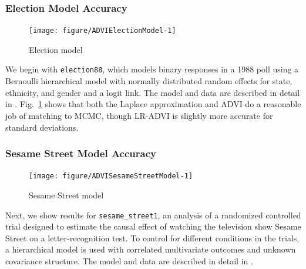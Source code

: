 \documentclass{article}\usepackage[]{graphicx}\usepackage[]{color}
\newenvironment{knitrout}{}{}
\theoremstyle{definition}
\theoremstyle{plain}
\theoremstyle{plain}
\theoremstyle{plain}
\theoremstyle{definition}
\theoremstyle{plain}
\theoremstyle{plain}
\newcommand{\fig}[1]{Fig.~\ref{fig:#1}}
\begin{document}
\subsubsection{Election Model Accuracy}
\begin{knitrout}
\color{fgcolor}\begin{figure}[t]

{\centering \texttt{[image: figure/ADVIElectionModel-1]} 

}

\caption[Election model]{Election model}\label{fig:ADVIElectionModel}
\end{figure}


\end{knitrout}

We begin with \texttt{election88}, which models binary responses in
a 1988 poll using a Bernoulli hierarchical model with normally distributed
random effects for state, ethnicity, and gender and a logit link.
The model and data are described in detail in \citet[Chapter 14]{gelman:2006:arm}.
\fig{ADVIElectionModel} shows that both the Laplace approximation
and ADVI do a reasonable job of matching to MCMC, though LR-ADVI is
slightly more accurate for standard deviations.

\subsubsection{Sesame Street Model Accuracy}

\begin{knitrout}
\color{fgcolor}\begin{figure}[t]

{\centering \texttt{[image: figure/ADVISesameStreetModel-1]} 

}

\caption[Sesame Street model]{Sesame Street model}\label{fig:ADVISesameStreetModel}
\end{figure}


\end{knitrout}

Next, we show results for \texttt{sesame\_street1}, an analysis of
a randomized controlled trial designed to estimate the causal effect
of watching the television show Sesame Street on a letter-recognition
test. To control for different conditions in the trials, a hierarchical
model is used with correlated multivariate outcomes and unknown covariance
structure. The model and data are described in detail in
\citet[Chapter 23]{gelman:2006:arm}.
\end{document}
